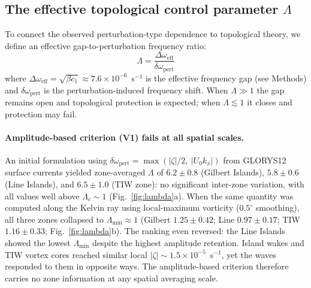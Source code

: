\documentclass[11pt]{article}
\begin{document}
\subsection{The effective topological control parameter $\Lambda$}

To connect the observed perturbation-type dependence to topological theory, we define an effective gap-to-perturbation frequency ratio:
\begin{equation}
\Lambda = \frac{\Delta\omega_\mathrm{eff}}{\delta\omega_\mathrm{pert}}
\label{eq:lambda}
\end{equation}
where $\Delta\omega_\mathrm{eff} = \sqrt{\beta c_1} \approx 7.6 \times 10^{-6}$~s$^{-1}$ is the effective frequency gap (see Methods) and $\delta\omega_\mathrm{pert}$ is the perturbation-induced frequency shift. When $\Lambda \gg 1$ the gap remains open and topological protection is expected; when $\Lambda \lesssim 1$ it closes and protection may fail.

\paragraph{Amplitude-based criterion (V1) fails at all spatial scales.}
An initial formulation using $\delta\omega_\mathrm{pert} = \max(|\zeta|/2,\ |U_0 k_x|)$ from GLORYS12 surface currents yielded zone-averaged $\Lambda$ of $6.2 \pm 0.8$ (Gilbert Islands), $5.8 \pm 0.6$ (Line Islands), and $6.5 \pm 1.0$ (TIW zone): no significant inter-zone variation, with all values well above $\Lambda_c \sim 1$ (Fig.~\ref{fig:lambda}a). When the same quantity was computed along the Kelvin ray using local-maximum vorticity ($0.5^\circ$ smoothing), all three zones collapsed to $\Lambda_\mathrm{min} \approx 1$ (Gilbert $1.25 \pm 0.42$; Line $0.97 \pm 0.17$; TIW $1.16 \pm 0.33$; Fig.~\ref{fig:lambda}b). The ranking even reversed: the Line Islands showed the lowest $\Lambda_\mathrm{min}$ despite the highest amplitude retention. Island wakes and TIW vortex cores reached similar local $|\zeta| \sim 1.5 \times 10^{-5}$~s$^{-1}$, yet the waves responded to them in opposite ways. The amplitude-based criterion therefore carries no zone information at any spatial averaging scale.
\end{document}
